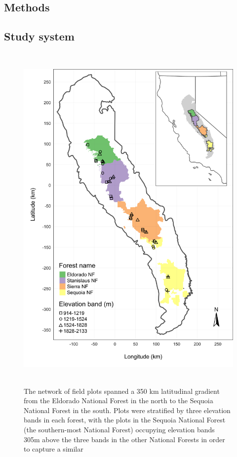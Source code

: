 \documentclass[twoside,12pt,final]{ucthesis-CA2012}
\begin{document}
\begin{ucmainmatter}
\section{Methods}\label{methods}

\subsection{Study system}\label{study-system-1}
\begin{figure}
\centering
\includegraphics[height=7.00000in]{figure/chap02/study-geographic-extent-inset.png}
\caption{The network of field plots spanned a 350 km latitudinal
gradient from the Eldorado National Forest in the north to the Sequoia
National Forest in the south. Plots were stratified by three elevation
bands in each forest, with the plots in the Sequoia National Forest (the
southern-most National Forest) occupying elevation bands 305m above the
three bands in the other National Forests in order to capture a similar
}
\end{figure}
\end{ucmainmatter}
\end{document}
